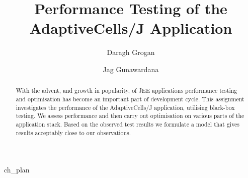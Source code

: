 \documentclass[10pt,a4paper,titlepage]{report}
\begin{document}
\title{Performance Testing of the AdaptiveCells/J Application}
\author{Daragh Grogan \and Jag Gunawardana}
\maketitle

\begin{abstract}
With the advent, and growth in popularity, of JEE applications performance testing and optimisation has become an important part of development cycle. This assignment investigates the performance of the AdaptiveCells/J application, utilising black-box testing. We assess performance and then carry out optimisation on various parts of the application stack. Based on the observed test results we formulate a model that gives results acceptably close to our observations.
\end{abstract}




\tableofcontents





 {ch_plan}











\appendix










\end{document}
